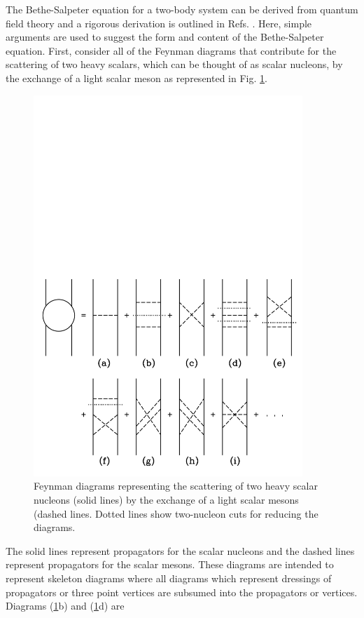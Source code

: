 \documentclass[mythesis.tex]{subfiles}
\begin{document}
The Bethe-Salpeter equation \cite{BetheSalpeter} for a two-body system
can be derived from
quantum field theory and a rigorous derivation is outlined in Refs.
\cite{Lurie,CoesterandRiska}.
Here,  simple arguments are used to suggest the form and content of the
Bethe-Salpeter equation. First, consider all of the Feynman diagrams that
contribute for the scattering of two heavy scalars, which can be thought
of as scalar nucleons, by the exchange of a
light scalar meson as represented in Fig. \ref{scat1}.
%
\begin{figure}
\centerline{\includegraphics[width=4in]{graphics/new/scat1.pdf}}
\vspace*{12pt} \caption{Feynman diagrams representing the
scattering of two heavy scalar nucleons (solid lines) by the
exchange of a light scalar mesons (dashed lines. Dotted lines show
two-nucleon cuts for reducing the diagrams.} \label{scat1}
\end{figure}
%
The solid lines
represent propagators for the scalar nucleons and the dashed lines
represent propagators for the scalar mesons.
These diagrams are
intended to represent skeleton diagrams where all diagrams which represent
dressings of propagators or three point vertices are subsumed into the
propagators or vertices. Diagrams (\ref{scat1}b) and (\ref{scat1}d) are
\end{document}
